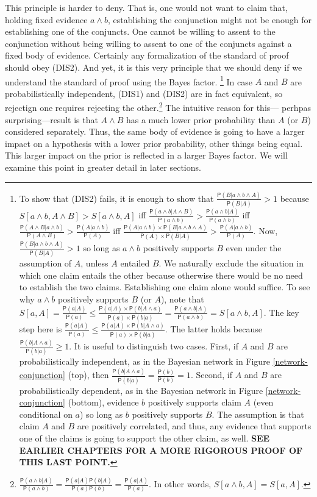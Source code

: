 \documentclass[10pt,dvipsnames,enabledeprecatedfontcommands]{scrartcl}
\newcommand{\pr}[1]{\mathsf{P}(#1)}
\begin{document}
\noindent
This principle is harder to deny. That is, one would not want to claim
that, holding fixed evidence \(a\wedge b\), establishing the conjunction
might not be enough for establishing one of the conjuncts. One cannot be
willing to assent to the conjunction without being willing to assent to
one of the conjuncts against a fixed body of evidence. Certainly any
formalization of the standard of proof should obey (DIS2). And yet, it
is this very principle that we should deny if we understand the standard
of proof using the Bayes factor.
\footnote{To show that (DIS2) fails, it is enough to show that $\frac{\pr{B \vert a\wedge b \wedge A}}{\pr{B \vert A}}>1$ because $S[a\wedge b, A\wedge B]>S[a\wedge b, A]$ iff $\frac{\pr{a\wedge b \vert A \wedge B}}{\pr{a\wedge b}}>\frac{\pr{a\wedge b \vert A}}{\pr{a\wedge b}}$ iff $\frac{\pr{A\wedge B \vert a \wedge b}}{\pr{A\wedge B}}>\frac{\pr{A \vert a \wedge b }}{\pr{A}}$ iff $\frac{\pr{A \vert a \wedge b} \times \pr{B \vert a\wedge b\wedge A}}{\pr{A} \times \pr{B \vert A}}>\frac{\pr{A \vert a \wedge b }}{\pr{A}}$. Now, $\frac{\pr{B \vert a\wedge b \wedge A}}{\pr{B \vert A}}>1$ so long as $a\wedge b$ positively supports $B$ even under the assumption of $A$, unless $A$ entailed $B$. We naturally exclude the situation in which one claim entails the other because otherwise there would be no need to establish the two claims. Establishing one claim alone would suffice. To see why $a\wedge b$ positively supports $B$ (or $A$), note that $S[a, A]=\frac{\pr{a |A}}{\pr{a}} \leq \frac{\pr{a |A} \times \pr{b | A \wedge a}}{\pr{a}\times \pr{b | a}}=\frac{\pr{a \wedge b |A}}{\pr{a\wedge b}}=S[a \wedge b, A]$. The key step here is $\frac{\pr{a |A}}{\pr{a}} \leq \frac{\pr{a |A} \times \pr{b | A \wedge a}}{\pr{a}\times \pr{b | a}}$. The latter holds because $\frac{\pr{b | A \wedge a}}{\pr{b | a}}\geq 1$. It is useful to distinguish two cases. First, if $A$ and $B$ are probabilistically independent, as in the Bayesian network in Figure \ref{network-conjunction} (top), then $\frac{\pr{b | A \wedge a}}{\pr{b | a}}= \frac{\pr{b}}{\pr{b}} = 1$. Second, if $A$ and $B$ are probabilistically dependent, as in the Bayesian network in Figure \ref{network-conjunction} (bottom), evidence $b$ positively supports claim $A$ (even conditional on $a$) so long as $b$ positively supports $B$. The assumption is that claim $A$ and $B$ are positively correlated, and thus, any evidence that supports one of the claims is going to support the other claim, as well. \textbf{SEE EARLIER CHAPTERS FOR A MORE RIGOROUS PROOF OF THIS LAST POINT.}}
In case \(A\) and \(B\) are probabilistically independent, (DIS1) and
(DIS2) are in fact equivalent, so rejectign one requires rejecting the
other.\footnote{$\frac{\pr{a\wedge b \vert A}}{\pr{a\wedge b}}=\frac{\pr{a \vert A}\pr{b \vert A}}{\pr{a}\pr{b}}=\frac{\pr{a \vert A}}{\pr{a}}$. In other words, $S[a \wedge b, A]=S[a, A]$.}
The intuitive reason for this--- perhpas surprising---result is that
\(A \wedge B\) has a much lower prior probability than \(A\) (or \(B\))
considered separately. Thus, the same body of evidence is going to have
a larger impact on a hypothesis with a lower prior probability, other
things being equal. This larger impact on the prior is reflected in a
larger Bayes factor. We will examine this point in greater detail in
later sections.
\end{document}
